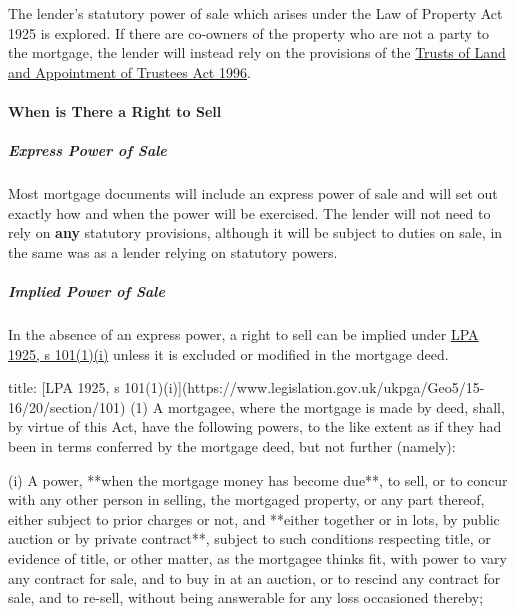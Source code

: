 \documentclass[
]{article}
\newenvironment{Shaded}{}{}
\newcommand{\NormalTok}[1]{#1}
\begin{document}
The lender's statutory power of sale which arises under the Law of
Property Act 1925 is explored. If there are co-owners of the property
who are not a party to the mortgage, the lender will instead rely on the
provisions of the
\href{https://www.legislation.gov.uk/ukpga/1996/47/contents}{Trusts of
Land and Appointment of Trustees Act 1996}.

\hypertarget{when-is-there-a-right-to-sell}{%
\paragraph{When is There a Right to
Sell}\label{when-is-there-a-right-to-sell}}

\hypertarget{express-power-of-sale}{%
\subparagraph{Express Power of Sale}\label{express-power-of-sale}}

Most mortgage documents will include an express power of sale and will
set out exactly how and when the power will be exercised. The lender
will not need to rely on \textbf{any} statutory provisions, although it
will be subject to duties on sale, in the same was as a lender relying
on statutory powers.

\hypertarget{implied-power-of-sale}{%
\subparagraph{Implied Power of Sale}\label{implied-power-of-sale}}

In the absence of an express power, a right to sell can be implied under
\href{https://www.legislation.gov.uk/ukpga/Geo5/15-16/20/section/101}{LPA
1925, s 101(1)(i)} unless it is excluded or modified in the mortgage
deed.

\begin{Shaded}
\begin{Highlighting}[]
\NormalTok{title:  [LPA 1925, s 101(1)(i)](https://www.legislation.gov.uk/ukpga/Geo5/15{-}16/20/section/101)}
\NormalTok{(1) A mortgagee, where the mortgage is made by deed, shall, by virtue of this Act, have the following powers, to the like extent as if they had been in terms conferred by the mortgage deed, but not further (namely):}

\NormalTok{(i) A power, **when the mortgage money has become due**, to sell, or to concur with any other person in selling, the mortgaged property, or any part thereof, either subject to prior charges or not, and **either together or in lots, by public auction or by private contract**, subject to such conditions respecting title, or evidence of title, or other matter, as the mortgagee thinks fit, with power to vary any contract for sale, and to buy in at an auction, or to rescind any contract for sale, and to re{-}sell, without being answerable for any loss occasioned thereby;}
\end{Highlighting}
\end{Shaded}
\end{document}

